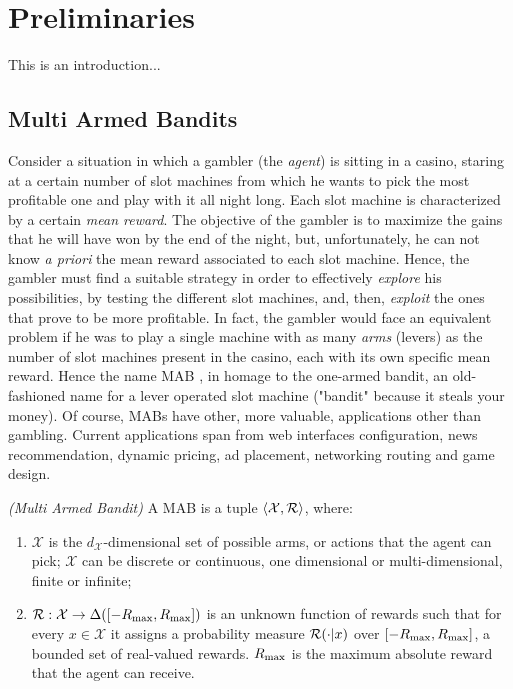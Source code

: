 
\chapter{Preliminaries}
This is an introduction...

\section{Multi Armed Bandits}
Consider a situation in which a gambler (the \emph{agent}) is sitting in a casino, staring at a certain number of slot machines from which he wants to pick the most profitable one and play with it all night long. Each slot machine is characterized by a certain \emph{mean reward}. The objective of the gambler is to maximize the gains that he will have won by the end of the night, but, unfortunately, he can not know \emph{a priori} the mean reward associated to each slot machine. Hence, the gambler must find a suitable strategy in order to effectively \emph{explore} his possibilities, by testing the different slot machines, and, then, \emph{exploit} the ones that prove to be more profitable. In fact, the gambler would face an equivalent problem if he was to play a single machine with as many \emph{arms} (levers) as the number of slot machines present in the casino, each with its own specific mean reward. Hence the name \gls{MAB} \cite{lai1985asymptotically}, in homage to the one-armed bandit, an old-fashioned name for a lever operated slot machine ("bandit" because it steals your money). Of course, \gls{MAB}s have other, more valuable, applications other than gambling. Current applications span from web interfaces configuration, news recommendation, dynamic pricing, ad placement, networking routing and game design. 

\begin{definition} \emph{(Multi Armed Bandit)}
A \gls{MAB} is a tuple $\langle\mathcal{X}, \mathcal{R}\rangle$, where:
\begin{enumerate}
\item $\mathcal{X}$ is the $d_{\mathcal{X}}$-dimensional set of possible arms, or actions that the agent can pick; $\mathcal{X}$ can be discrete or continuous, one dimensional or multi-dimensional, finite or infinite; 
\item $\mathcal{R}:\mathcal{X}\to\Delta([-R_{\max},R_{\max}])$ is an unknown function of rewards such that for every $x\in\mathcal{X}$ it assigns a probability measure $\mathcal{R}(\cdot|x)$ over $[-R_{\max},R_{\max}]$, a bounded set of real-valued rewards. $R_{\max}$ is the maximum absolute reward that the agent can receive.
\end{enumerate}
\end{definition}

